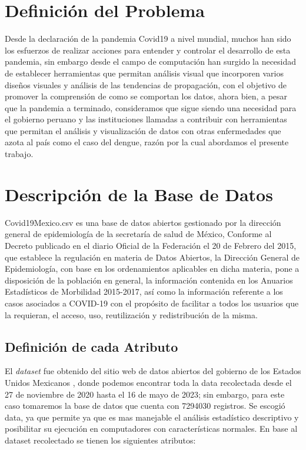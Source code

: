 %
%

\section{Definición del Problema}

Desde la declaración de la pandemia Covid19 a nivel mundial, muchos han sido los esfuerzos de realizar acciones para entender y controlar el desarrollo de esta pandemia, sin embargo desde el campo de computación han surgido la necesidad de establecer herramientas que permitan análisis visual que incorporen varios diseños visuales y análisis de las tendencias de propagación, con el objetivo de promover la comprensión de como se comportan los datos, ahora bien, a pesar que la pandemia a terminado, consideramos que sigue siendo una necesidad para el gobierno peruano y las instituciones llamadas a contribuir con herramientas que permitan el análisis y visualización de datos con otras enfermedades que azota al país como el caso del dengue, razón por la cual abordamos el presente trabajo.


\section{Descripción de la Base de Datos}


Covid19Mexico.csv es una base de datos abiertos gestionado por la dirección general de epidemiología de la secretaría de salud de México, Conforme al Decreto publicado en el diario Oficial de la Federación el 20 de Febrero del 2015, que establece la regulación en materia de Datos Abiertos, la Dirección General de Epidemiología, con base en los ordenamientos aplicables en dicha materia, pone a disposición de la población en general, la información contenida en los Anuarios Estadísticos de Morbilidad 2015-2017, así como la información referente a los casos asociados a COVID-19 con el propósito de facilitar a todos los usuarios que la requieran, el acceso, uso, reutilización y redistribución de la misma.


\subsection{Definición de cada Atributo}
El \textit{dataset} fue obtenido del sitio web de datos abiertos del gobierno de los Estados Unidos Mexicanos , donde podemos encontrar toda la data
recolectada desde el 27 de noviembre de 2020 hasta el 16 de mayo de 2023; sin embargo, para este caso  tomaremos la base de datos que cuenta con 7294030 registros. Se escogió data, ya que permite ya que es mas manejable el análisis estadístico descriptivo y posibilitar su ejecución en computadores con características normales. En base al dataset recolectado se tienen los siguientes atributos:

